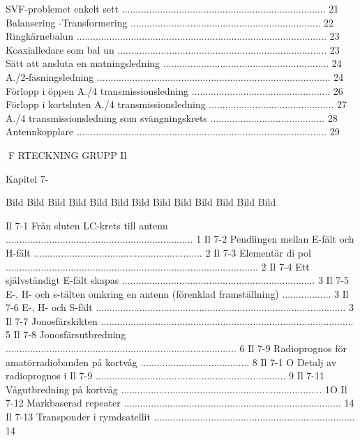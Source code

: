 SVF-problemet enkelt sett ........................................................................... 21
Balansering -Transformering ...................................................................... 22
Ringkärnebalun ............................................................................................ 23
Koaxialledare som bal un ............................................................................. 23
Sätt att ansluta en matningsledning ............................................................. 24
A./2-fasningsledning ...................................................................................... 24
Förlopp i öppen A./4 transmissionsledning ................................................... 26
Förlopp i kortsluten A./4 transmissionsledning .............................................. 27
A./4 transmissionsledning som svängningskrets .......................................... 28
Antennkopplare ............................................................................................ 29

F RTECKNING
GRUPP Il

Kapitel 7-

Bild
Bild
Bild
Bild
Bild
Bild
Bild
Bild
Bild
Bild
Bild
Bild
Bild

Il 7-1
Från sluten LC-krets till antenn ..................................................................... 1
Il 7-2
Pendlingen mellan E-fält och H-fält .............................................................. 2
Il 7-3
Elementär di pol ............................................................................................. 2
Il 7-4
Ett självständigt E-fält skapas ....................................................................... 3
Il 7-5
E-, H- och s-tälten omkring en antenn (förenklad framställning) .................. 3
Il 7-6
E-, H- och S-fält ............................................................................................ 3
Il 7-7
Jonosfärskikten ............................................................................................. 5
Il 7-8
Jonosfärsutbredning ..................................................................................... 6
Il 7-9
Radioprognos för amatörradiobanden på kortvåg ........................................ 8
Il 7-1 O Detalj av radioprognos i Il 7-9 ...................................................................... 9
Il 7-11 Vågutbredning på kortvåg .......................................................................... 1O
Il 7-12 Markbaserad repeater ................................................................................ 14
Il 7-13 Transponder i rymdsatellit .......................................................................... 14

